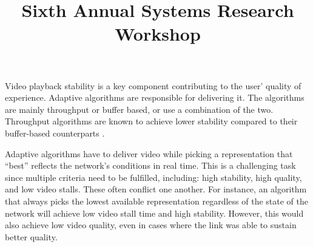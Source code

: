 \documentclass[10pt]{article}
\title{Sixth Annual Systems Research Workshop}
\date{}
\begin{document}
\maketitle




Video playback stability is a key component contributing to the user' quality of experience. Adaptive algorithms are responsible for delivering it. The algorithms are mainly throughput or buffer based, or use a combination of the two. Throughput algorithms are known to achieve lower stability compared to their buffer-based counterparts \cite{Spiteri-2016-Bola}.


Adaptive algorithms have to deliver video while picking a representation that ``best'' reflects the network's conditions in real time. This is a challenging task since multiple criteria need to be fulfilled, including: high stability, high quality, and low video stalls. These often conflict one another. For instance, an algorithm that always picks the lowest available representation regardless of the state of the network will achieve low video stall time and high stability. However, this would also achieve low video quality, even in cases where the link was able to sustain better quality.
\end{document}
